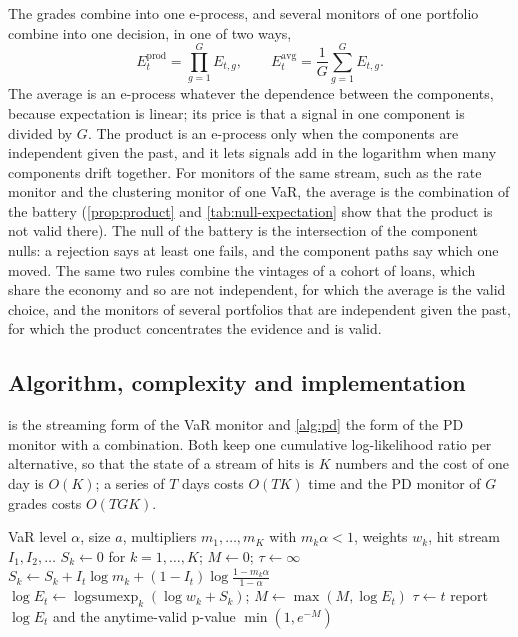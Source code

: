 The grades combine into one e-process, and several monitors of one portfolio combine into one decision, in one of two ways,
\begin{equation}
E_t^{\mathrm{prod}}=\prod_{g=1}^{G}E_{t,g},\qquad E_t^{\mathrm{avg}}=\frac1G\sum_{g=1}^{G}E_{t,g}.
\label{eq:combine}
\end{equation}
The average is an e-process whatever the dependence between the components, because expectation is linear; its price is that a signal in one component is divided by $G$. The product is an e-process only when the components are independent given the past,
and it lets signals add in the logarithm when many components drift together. For monitors of the same stream, such as the rate monitor and the clustering monitor of one VaR, the average is the combination of the battery (\cref{prop:product} and \cref{tab:null-expectation}
show that the product is not valid there). The null of the battery is the intersection of the component nulls: a rejection says at least one fails, and the component paths say which one moved. The same two rules combine the vintages of a cohort of loans, which share the economy and so are not independent, for which the average is the valid choice, and the monitors of several portfolios that are independent given the past, for which the product concentrates the evidence and is valid.

\subsection{Algorithm, complexity and implementation}
\label{sec:method-algorithm}

 is the streaming form of the VaR monitor and \cref{alg:pd} the form of the PD monitor with a combination. Both keep one cumulative log-likelihood ratio per alternative, so that the state of a stream of
hits is $K$ numbers and the cost of one day is $O(K)$; a series of $T$ days costs $O(TK)$ time and the PD monitor of $G$ grades costs $O(TGK)$.

\begin{algorithm}[htbp]
\caption{Streaming VaR hit-rate monitor with anytime-valid rejection.}
\label{alg:var}
\begin{algorithmic}[1]
\Require VaR level $\alpha$, size $a$, multipliers $m_1,\dots,m_K$ with $m_k\alpha<1$, weights $w_k$, hit stream $I_1,I_2,\dots$
\State $S_k\gets 0$ for $k=1,\dots,K$; $M\gets 0$; $\tau\gets\infty$
    \State $S_k\gets S_k+I_t\log m_k+(1-I_t)\log\frac{1-m_k\alpha}{1-\alpha}$
  \EndFor
  \State $\log E_t\gets\operatorname{logsumexp}_k(\log w_k+S_k)$; $M\gets\max(M,\log E_t)$
   $\tau\gets t$ 
  \EndIf
  \State report $\log E_t$ and the anytime-valid p-value $\min(1,e^{-M})$
\EndFor
\end{algorithmic}
\end{algorithm}

